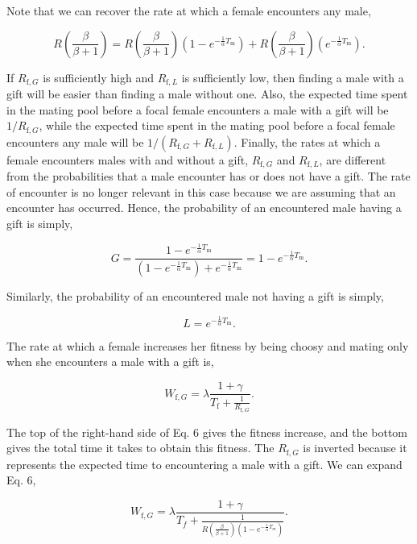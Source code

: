 \documentclass[
]{article}
\begin{document}
Note that we can recover the rate at which a female encounters any male,

\[R \left(\frac{\beta}{\beta + 1}\right) = R \left(\frac{\beta}{\beta + 1}\right) \left(1 - e^{-\frac{1}{\alpha}T_{\mathrm{m}}}\right) + R \left(\frac{\beta}{\beta + 1}\right) \left(e^{-\frac{1}{\alpha}T_{\mathrm{m}}}\right).\]

If \(R_{\mathrm{f},G}\) is sufficiently high and \(R_{\mathrm{f},L}\) is
sufficiently low, then finding a male with a gift will be easier than
finding a male without one. Also, the expected time spent in the mating
pool before a focal female encounters a male with a gift will be
\(1/R_{\mathrm{f},G}\), while the expected time spent in the mating pool
before a focal female encounters any male will be
\(1 / (R_{\mathrm{f},G} + R_{\mathrm{f},L})\). Finally, the rates at
which a female encounters males with and without a gift,
\(R_{\mathrm{f},G}\) and \(R_{\mathrm{f}, L}\), are different from the
probabilities that a male encounter has or does not have a gift. The
rate of encounter is no longer relevant in this case because we are
assuming that an encounter has occurred. Hence, the probability of an
encountered male having a gift is simply,

\[G = \frac{1 - e^{-\frac{1}{\alpha}T_{\mathrm{m}}}}{\left(1 - e^{-\frac{1}{\alpha}T_{\mathrm{m}}}\right) + e^{-\frac{1}{\alpha}T_{\mathrm{m}}}} = 1 - e^{-\frac{1}{\alpha}T_{\mathrm{m}}}.\]

Similarly, the probability of an encountered male not having a gift is
simply,

\[L = e^{-\frac{1}{\alpha}T_{\mathrm{m}}}.\]

The rate at which a female increases her fitness by being choosy and
mating only when she encounters a male with a gift is,

\begin{equation}
W_{\mathrm{f}, G} = \lambda \frac{1 + \gamma}{T_{\mathrm{f}} + \frac{1}{R_{\mathrm{f},G}}}.
\end{equation}

The top of the right-hand side of Eq. 6 gives the fitness increase, and
the bottom gives the total time it takes to obtain this fitness. The
\(R_{\mathrm{f},G}\) is inverted because it represents the expected time
to encountering a male with a gift. We can expand Eq. 6,

\[W_{\mathrm{f},G} = \lambda \frac{1 + \gamma}{T_{f} + \frac{1}{R \left(\frac{\beta}{\beta + 1}\right)\left(1 - e^{-\frac{1}{\alpha}T_{m}}\right)}}.\]
\end{document}
